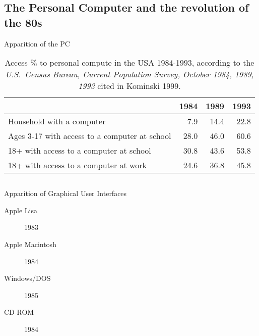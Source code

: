 \documentclass[aspectratio=169]{beamer}
\begin{document}
\subsection{The Personal Computer and the revolution of the 80s}

\begin{frame}{Apparition of the PC}

\begin{table}[h]
    \centering
    \footnotesize
    \begin{tabular}{l|rrr}
                                                   & 1984 & 1989 & 1993 \\ \hline  \hline
    Household with a computer & 7.9 & 14.4 & 22.8 \\ \hline 
    Ages 3-17 with access to a computer at school & 28.0 & 46.0 & 60.6 \\
    18+ with access to a computer at school & 30.8 & 43.6 & 53.8 \\
    18+ with access to a computer at work & 24.6 & 36.8 & 45.8 \\ \hline
    \end{tabular}
    \caption{Access \% to personal compute in the USA 1984-1993, according to the \textit{U.S.~Census Bureau, Current Population Survey, October 1984, 1989, 1993} cited in Kominski 1999.}
    \label{tab:computer-ownership}
\end{table}

\begin{columns}
    \begin{column}{.45\textwidth}
        Apparition of Graphical User Interfaces
    
        \begin{description}
            \item[Apple Lisa] 1983 
            \item[Apple Macintosh] 1984
            \item[Windows/DOS] 1985
            \item[CD-ROM] 1984
        \end{description}
    \end{column}\hfill
    \begin{column}{.45\textwidth}
    \end{column}
\end{columns}

\end{frame}
\end{document}

